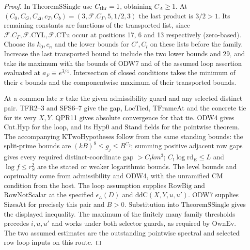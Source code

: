 \begin{proof}
In $\mathrm{TheoremSSingle}$ use $C_{\rm thr}=1$, obtaining
$C_A\ge1$. At $(C_0,C_G,C_\Delta,c_T,C_b)=
(3,\mathcal F.C_\Gamma,5,1/2,3)$ the last product is $3/2>1$.
Its remaining constants are functions of the transported list,
since $\mathcal F.C_\Gamma,\mathcal F.\mathrm{CYL},
\mathcal F.\mathrm{CTu}$ occur at positions 17, 6 and 13
respectively (zero-based). Choose its $k_0,c_n$ and the lower
bounds for $C',C_l$ on these lists before the family. Increase
the last transported bound to include the two lower bounds and
29, and take its maximum with the bounds of ODW7 and of the
assumed loop assertion evaluated at $a_F\equiv e^{3/4}$.
Intersection of closed conditions takes the minimum of their
$\epsilon$ bounds and the componentwise maximum of their
transported bounds.

At a common late $x$ take the given admissibility guard and any
selected distinct pair. TFR2--3 and SFS6--7 give the gap,
$\mathrm{LocTied}$, $\mathrm{TFrameAt}$ and the concrete tie
for its very $X,Y$. QPR11 gives absolute convergence for that tie.
ODW4 gives $\mathrm{Cnt.Hyp}$ for the loop, and its
$\mathrm{Hyp0}$ and $\mathrm{Stand}$ fields for the pointwise
theorem. The accompanying $\mathrm{KTwoHypotheses}$ follow
from the same standing bounds: the split-prime bounds are
$(kB)^8\le g_j\le B^{C_g}$; summing positive adjacent row gaps
gives every required distinct-coordinate gap $>C_l k m^3$;
$C_l\log\mathrm{rd}_E\le L$ and $\log f\le r_S^2$ are the
stated or weaker logarithmic bounds. The level bounds and
coprimality come from admissibility and ODW4, with the unramified
CM condition from the host. The loop assumption supplies
$\mathrm{RowBig}$ and $\mathrm{RowNotScalar}$ at the specified
$\epsilon_L(D)$ and $\mathrm{ddC}(X,Y,u,u')$. ODW7 supplies
$\mathrm{SizesAt}$ for precisely this pair and $B>0$.
Substitution into $\mathrm{TheoremSSingle}$ gives the displayed
inequality. The maximum of the finitely many family thresholds
precedes $i,u,u'$ and works under both selector guards, as
required by $\mathrm{OwnEv}$. The two assumed estimates are the
outstanding pointwise spectral and selected row-loop inputs on
this route.
\end{proof}
